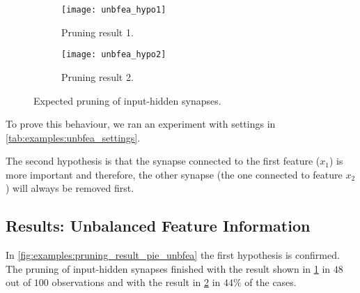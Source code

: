 \begin{figure}[H]
\centering
\begin{subfigure}{.4\textwidth}
  \centering
  \texttt{[image: unbfea\_hypo1]}
  \caption{Pruning result 1.}
  \label{fig:examples:unbfea_hypo1}
\end{subfigure}
\begin{subfigure}{.4\textwidth}
  \centering
  \texttt{[image: unbfea\_hypo2]}
  \caption{Pruning result 2.}
  \label{fig:examples:unbfea_hypo2}
\end{subfigure}
\caption{Expected pruning of input-hidden synapses.}
\label{fig:examples:unbfea_hypos}
\end{figure}

To prove this behaviour, we ran an experiment with settings in \cref{tab:examples:unbfea_settings}.

\begin{table}[H]
\centering
{}
\caption{Experiment settings for dataset with unbalanced feature information.}
\label{tab:examples:unbfea_settings}
\end{table}

The second hypothesis is that the synapse connected to the first feature ($ x_1 $) is more important and therefore, the other synapse (the one connected to feature $ x_2 $) will always be removed first.

\subsection*{Results: Unbalanced Feature Information}
In \cref{fig:examples:pruning_result_pie_unbfea} the first hypothesis is confirmed. The pruning of input-hidden synapses finished with the result shown in \cref{fig:examples:unbfea_hypo1} in $ 48 $ out of $ 100 $ observations and with the result in \cref{fig:examples:unbfea_hypo2} in $ 44\% $ of the cases.

